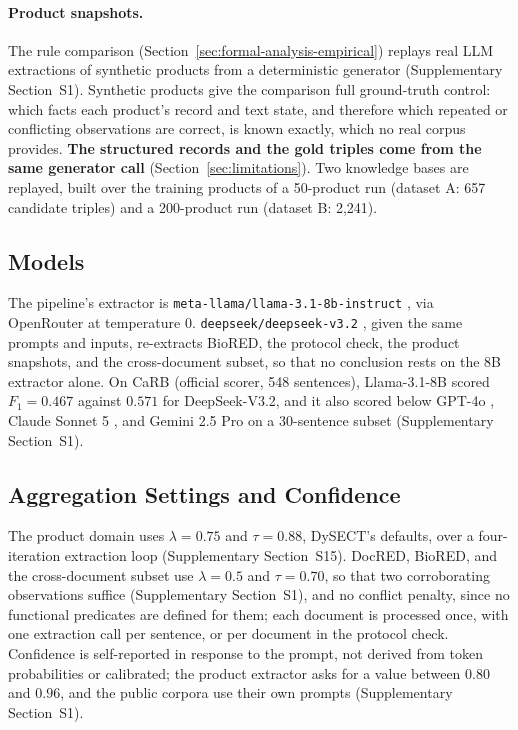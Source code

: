 \documentclass[preprint,12pt,authoryear]{elsarticle}
\begin{document}
\paragraph{Product snapshots.} The rule comparison
(Section~\ref{sec:formal-analysis-empirical}) replays real LLM
extractions of synthetic products from a deterministic generator
(Supplementary Section~S1). Synthetic products give the comparison full
ground-truth control: which facts each product's record and text state,
and therefore which repeated or conflicting observations are correct, is
known exactly, which no real corpus provides. \textbf{The structured records and the gold
triples come from the same generator call}
(Section~\ref{sec:limitations}). Two knowledge bases are replayed, built
over the training products of a 50-product run (dataset A: 657
candidate triples) and a 200-product run (dataset B: 2,241).

\subsection{Models}
\label{sec:setup-models}

The pipeline's extractor is \texttt{meta-llama/llama-3.1-8b-instruct}
\citep{grattafiori2024llama3}, via OpenRouter at temperature $0$.
\texttt{deepseek/deepseek-v3.2} \citep{deepseekai2025deepseekv32},
given the same prompts and inputs, re-extracts BioRED, the protocol
check, the product snapshots, and the cross-document subset, so that no
conclusion rests on the 8B extractor alone.
On CaRB \citep{bhardwaj2019carb} (official scorer, 548 sentences),
Llama-3.1-8B scored $F_1=0.467$ against $0.571$ for DeepSeek-V3.2, and it
also scored below GPT-4o \citep{openai2024gpt4o}, Claude Sonnet 5
\citep{anthropic2026claudesonnet5}, and Gemini 2.5 Pro
\citep{comanici2025gemini25} on a 30-sentence subset (Supplementary
Section~S1).

\subsection{Aggregation Settings and Confidence}
\label{sec:setup-hyperparameters}

The product domain uses $\lambda=0.75$ and $\tau=0.88$, DySECT's
defaults, over a four-iteration extraction loop (Supplementary
Section~S15). DocRED, BioRED, and the cross-document subset use
$\lambda=0.5$ and $\tau=0.70$, so that two corroborating observations
suffice (Supplementary Section~S1), and no conflict penalty, since no
functional predicates are defined for them; each document is processed
once, with one extraction call per sentence, or per document in the
protocol check.
Confidence is self-reported in response to the prompt, not derived from
token probabilities or calibrated; the product extractor asks for a
value between $0.80$ and $0.96$, and the public corpora use their own
prompts (Supplementary Section~S1).
\end{document}
